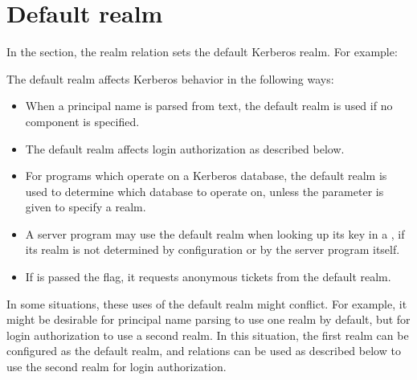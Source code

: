 \documentclass[letterpaper,10pt,english]{sphinxmanual}
\begin{document}
\section{Default realm}
\label{\detokenize{admin/host_config:default-realm}}
In the {\hyperref[\detokenize{admin/conf_files/krb5_conf:libdefaults}]{}} section, the  realm
relation sets the default Kerberos realm.  For example:

%
\begin{sphinxVerbatim}[commandchars=\\\{\}]
\PYG{p}{[}\PYG{p}{]}
      
\end{sphinxVerbatim}

The default realm affects Kerberos behavior in the following ways:
\begin{itemize}
\item {} 
When a principal name is parsed from text, the default realm is used
if no  component is specified.

\item {} 
The default realm affects login authorization as described below.

\item {} 
For programs which operate on a Kerberos database, the default realm
is used to determine which database to operate on, unless the 
parameter is given to specify a realm.

\item {} 
A server program may use the default realm when looking up its key
in a {\hyperref[\detokenize{admin/install_appl_srv:keytab-file}]{}}, if its realm is not
determined by {\hyperref[\detokenize{admin/conf_files/krb5_conf:domain-realm}]{}} configuration or by the server
program itself.

\item {} 
If  is passed the  flag, it requests anonymous
tickets from the default realm.

\end{itemize}

In some situations, these uses of the default realm might conflict.
For example, it might be desirable for principal name parsing to use
one realm by default, but for login authorization to use a second
realm.  In this situation, the first realm can be configured as the
default realm, and  relations can be used as
described below to use the second realm for login authorization.
\end{document}
